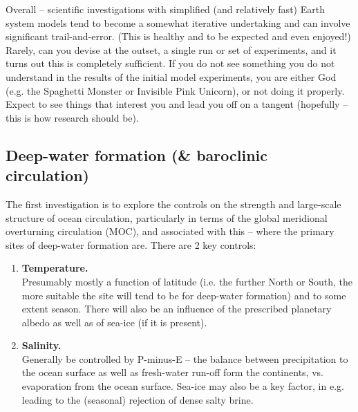 \noindent Overall -- scientific investigations with simplified (and relatively fast) Earth system models tend to become a somewhat iterative undertaking and can involve significant trail-and-error. (This is healthy and to be expected and even enjoyed!) Rarely, can you devise at the outset, a single run or set of experiments, and it turns out this is completely sufficient. If you do not see something you do not understand in the results of the initial model experiments, you are either God (e.g. the Spaghetti Monster or Invisible Pink Unicorn), or not doing it properly. Expect to see things that interest you and lead you off on a tangent (hopefully -- this is how research should be).

\newpage

\subsection{Deep-water formation (\& baroclinic circulation)}

The first investigation is to explore the controls on the strength and large-scale structure of ocean circulation, particularly in terms of the global meridional overturning circulation (MOC), and associated with this -- where the primary sites of deep-water formation are. There are 2 key controls:

\vspace{1mm}
\begin{enumerate}
\vspace{1mm}
\item \textbf{Temperature.}
\\Presumably mostly a function of latitude (i.e. the further North or South, the more suitable the site will tend to be for deep-water formation) and to some extent season. There will also be an influence of the prescribed planetary albedo as well as of sea-ice (if it is present).
\vspace{1mm}
\item \textbf{Salinity.}
\\Generally be controlled by P-minus-E -- the balance between precipitation to the ocean surface as well as fresh-water run-off form the continents, vs. evaporation from the ocean surface. Sea-ice may also be a key factor, in e.g. leading to the (seasonal) rejection of dense salty brine.
\end{enumerate}
\vspace{2mm}

